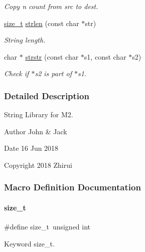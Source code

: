 \begin{DoxyCompactItemize}
\begin{DoxyCompactList}\small\item\em Copy n count from src to dest. \end{DoxyCompactList}\item 
\mbox{\hyperlink{a00038_a43b4547e12226fef871eed8afe191ad7}{size\+\_\+t}} \mbox{\hyperlink{a00038_a008e171a518fe0e0352f31b245e03875}{strlen}} (const char $\ast$str)
\begin{DoxyCompactList}\small\item\em String length. \end{DoxyCompactList}\item 
char $\ast$ \mbox{\hyperlink{a00038_aeb923ee2a7a01f82eb1e2f8ae188c6d4}{strstr}} (const char $\ast$s1, const char $\ast$s2)
\begin{DoxyCompactList}\small\item\em Check if $\ast$s2 is part of $\ast$s1. \end{DoxyCompactList}\end{DoxyCompactItemize}


\subsubsection{Detailed Description}
String Library for M2. 

\begin{DoxyAuthor}{Author}
John \& Jack 
\end{DoxyAuthor}
\begin{DoxyDate}{Date}
16 Jun 2018 
\end{DoxyDate}
\begin{DoxyCopyright}{Copyright}
2018 Zhirui 
\end{DoxyCopyright}


\subsubsection{Macro Definition Documentation}
\mbox{\label{a00038_a43b4547e12226fef871eed8afe191ad7}} 
\paragraph{\texorpdfstring{size\+\_\+t}{size\_t}}
{\footnotesize\ttfamily \#define size\+\_\+t~unsigned int}

Keyword size\+\_\+t. 

